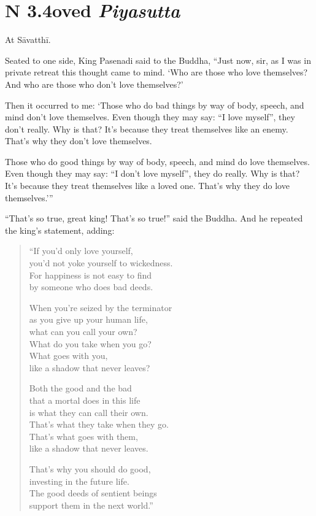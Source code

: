 \documentclass[12pt,openany]{book}%
\newcommand*{\suttatitleacronym}[1]{\smaller[2]{#1}\vspace*{.3em}}
\newcommand*{\suttatitletranslation}[1]{\linebreak{#1}}
\newcommand*{\suttatitleroot}[1]{\linebreak\smaller[2]\itshape{#1}}
\newcommand*{\tocacronym}[1]{\hspace*{-3.3em}{#1}\quad}
\newcommand*{\toctranslation}[1]{#1}
\newcommand*{\tocroot}[1]{(\textit{#1})}
\begin{document}
%
\section*{{\suttatitleacronym SN 3.4}{\suttatitletranslation Loved }{\suttatitleroot Piyasutta}}
\addcontentsline{toc}{section}{\tocacronym{SN 3.4} \toctranslation{Loved } \tocroot{Piyasutta}}

At \textsanskrit{Sāvatthī}. 

Seated to one side, King Pasenadi said to the Buddha, “Just now, sir, as I was in private retreat this thought came to mind. ‘Who are those who love themselves? And who are those who don’t love themselves?’ 

Then it occurred to me: ‘Those who do bad things by way of body, speech, and mind don’t love themselves. Even though they may say: “I love myself”, they don’t really. Why is that? It’s because they treat themselves like an enemy. That’s why they don’t love themselves. 

Those who do good things by way of body, speech, and mind do love themselves. Even though they may say: “I don’t love myself”, they do really. Why is that? It’s because they treat themselves like a loved one. That’s why they do love themselves.’” 

“That’s so true, great king! That’s so true!” said the Buddha. And he repeated the king’s statement, adding: 

\begin{verse}%
“If you’d only love yourself, \\
you’d not yoke yourself to wickedness. \\
For happiness is not easy to find \\
by someone who does bad deeds. 

When you’re seized by the terminator \\
as you give up your human life, \\
what can you call your own? \\
What do you take when you go? \\
What goes with you, \\
like a shadow that never leaves? 

Both the good and the bad \\
that a mortal does in this life \\
is what they can call their own. \\
That’s what they take when they go. \\
That’s what goes with them, \\
like a shadow that never leaves. 

That’s why you should do good, \\
investing in the future life. \\
The good deeds of sentient beings \\
support them in the next world.” 

%
\end{verse}
\end{document}
